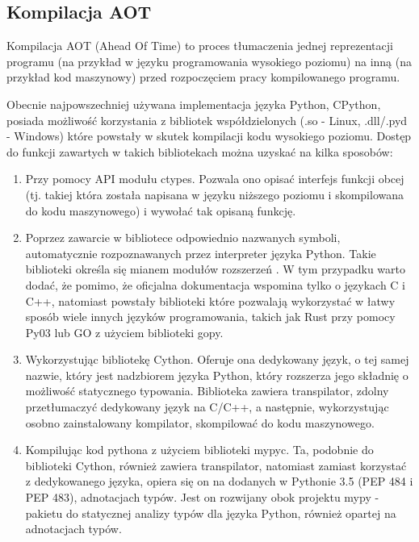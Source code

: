\documentclass[11pt, a4paper]{article}
\begin{document}
\begin{sloppypar}
    \subsection{Kompilacja AOT}
    Kompilacja AOT (Ahead Of Time) to proces tłumaczenia jednej reprezentacji programu (na
    przykład w języku programowania wysokiego poziomu) na inną (na przykład kod maszynowy)
    przed rozpoczęciem pracy kompilowanego programu.

    Obecnie najpowszechniej używana implementacja języka Python, CPython, posiada
    możliwość korzystania z bibliotek współdzielonych (.so - Linux, .dll/.pyd - Windows)
    które powstały w skutek kompilacji kodu wysokiego poziomu. Dostęp do funkcji zawartych
    w takich bibliotekach można uzyskać na kilka sposobów:

    \begin{enumerate}
      \item Przy pomocy API modułu ctypes\cite{Python_ctypes}. Pozwala ono opisać interfejs
        funkcji obcej (tj. takiej która została napisana w języku niższego poziomu i skompilowana
        do kodu maszynowego) i wywołać tak opisaną funkcję.

      \item Poprzez zawarcie w bibliotece odpowiednio nazwanych symboli, automatycznie
        rozpoznawanych przez interpreter języka Python. Takie biblioteki określa się mianem
        modułów rozszerzeń \cite{Extending_Python_With_C_Cpp}. W tym przypadku warto
        dodać, że pomimo, że oficjalna dokumentacja wspomina tylko o językach C i C++, natomiast
        powstały biblioteki które pozwalają wykorzystać w łatwy sposób wiele innych języków
        programowania, takich jak Rust przy pomocy Py03\cite{PyO3} lub GO z użyciem biblioteki
        gopy\cite{gopy}.

      \item Wykorzystując bibliotekę Cython\cite{Cython_Org}\cite{Cython_The_Best_Of_Both}.
        Oferuje ona dedykowany język, o tej samej nazwie, który jest nadzbiorem języka
        Python, który rozszerza jego składnię o możliwość statycznego typowania.
        Biblioteka zawiera transpilator, zdolny przetłumaczyć dedykowany język na C/C++,
        a następnie, wykorzystując osobno zainstalowany kompilator, skompilować do kodu
        maszynowego.

      \item Kompilując kod pythona z użyciem biblioteki mypyc\cite{mypyc}. Ta, podobnie
        do biblioteki Cython, również zawiera transpilator, natomiast zamiast korzystać
        z dedykowanego języka, opiera się on na dodanych w Pythonie 3.5\cite{Python_3_5}
        (PEP 484\cite{PEP_484} i PEP 483\cite{PEP_483}), adnotacjach typów. Jest on
        rozwijany obok projektu mypy - pakietu do statycznej analizy typów dla języka
        Python, również opartej na adnotacjach typów\cite{mypy}.
    \end{enumerate}


\end{sloppypar}
\end{document}
